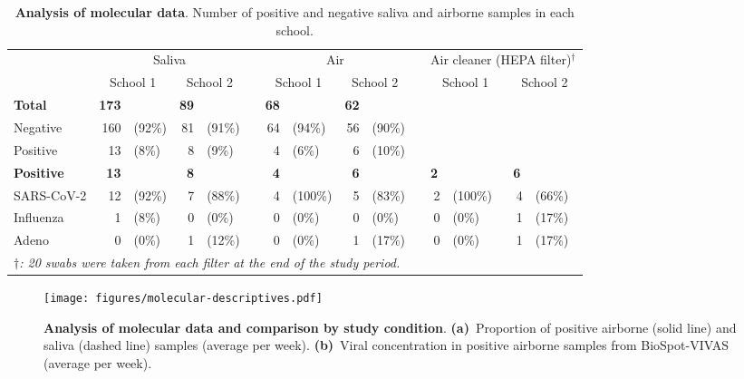 \documentclass[fleqn,11pt]{wlscirep}
\begin{document}
\begin{table}[!htpb]
    \centering
    \caption{\textbf{Analysis of molecular data}. Number of positive and negative saliva and airborne samples in each school.}
    \label{tab:molecular-data}
    \footnotesize
    \begin{tabular}{l rlrl p{.2cm} rlrl p{.2cm} rlrl}
    \toprule
    & \multicolumn{4}{c}{Saliva} & & \multicolumn{4}{c}{Air} & & \multicolumn{4}{c}{Air cleaner (HEPA filter)$^\dag$} \\ \cline{2-5} \cline{7-10} \cline{12-15} 
    & \multicolumn{2}{c}{School 1} & \multicolumn{2}{c}{School 2} & &  \multicolumn{2}{c}{School 1} & \multicolumn{2}{c}{School 2} & & \multicolumn{2}{c}{School 1} & \multicolumn{2}{c}{School 2} \\
    \midrule
    \textbf{Total} & \textbf{173} & & \textbf{89} & & & \textbf{68} & & \textbf{62} & & &  & &  & \\
    Negative & 160 & (\hphantom{0}92\%) & 81 & (\hphantom{0}91\%) & & 64 & (\hphantom{0}94\%) & 56 & (\hphantom{0}90\%) & &  & &  & \\  
    Positive & 13 & (\hphantom{00}8\%) & 8 & (\hphantom{00}9\%) & & 4 & (\hphantom{00}6\%) & 6 & (\hphantom{0}10\%) & & & &  & \\
    \midrule
    \textbf{Positive} & \textbf{13} & & \textbf{8} &  & & \textbf{4} & & \textbf{6} & & & \multicolumn{2}{l}{\textbf{2}}  & \multicolumn{2}{l}{\textbf{6}} \\
    SARS-CoV-2 & 12 & (\hphantom{0}92\%) & 7 & (\hphantom{0}88\%) & & 4 & (100\%) & 5 & (\hphantom{0}83\%) & & 2 & (100\%) & 4 & (\hphantom{0}66\%) \\
    Influenza & 1 & (\hphantom{00}8\%) & 0 & (\hphantom{00}0\%) & & 0 & (\hphantom{00}0\%) & 0 & (\hphantom{00}0\%) & & 0 & (\hphantom{00}0\%) & 1 & (\hphantom{0}17\%) \\
    Adeno & 0 & (\hphantom{00}0\%) & 1 & (\hphantom{0}12\%) & & 0 & (\hphantom{00}0\%) & 1 & (\hphantom{0}17\%) & & 0 & (\hphantom{00}0\%) & 1 & (\hphantom{0}17\%) \\
    \bottomrule
    \multicolumn{15}{l}{\scriptsize \emph{$\dag$: 20 swabs were taken from each filter at the end of the study period.}}
    \end{tabular}
\end{table}

\begin{figure}[!htpb]
    \centering
    \texttt{[image: figures/molecular-descriptives.pdf]}
    \caption{\textbf{Analysis of molecular data and comparison by study condition}. \textbf{(a)}~Proportion of positive airborne (solid line) and saliva (dashed line) samples (average per week). \textbf{(b)}~Viral concentration in positive airborne samples from BioSpot-VIVAS (average per week).}
    \label{fig:molecular-descriptives}
\end{figure}
\end{document}
